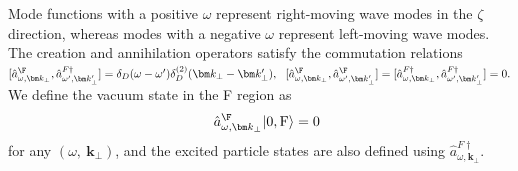 \documentclass[aps,prd,preprintnumbers,nofootinbib,showpacs]{revtex4}%
\begin{document}
\begin{widetext}
Mode functions with a positive $\omega$  
represent right-moving wave modes in the $\zeta$ direction,
whereas modes with a negative
$\omega$ represent left-moving wave modes. 
The creation and annihilation operators satisfy the commutation relations
$[{\hat a}^\F_{\omega,\bm k_\perp}, {\hat a}_{\omega',\bm k_\perp'}^{F\dagger}]
=\delta_D(\omega-\omega') \delta_D^{(2)}(\bm k_\perp-\bm k_\perp'), 
~~
[{\hat a}^\F_{\omega,\bm k_\perp}, {\hat a}_{\omega',\bm k_\perp'}^\F]
=[{\hat a}^{F\dagger}_{\omega,\bm k_\perp}, {\hat a}_{\omega',\bm k_\perp'}^{F\dagger}]
=0.
$
We define the vacuum state in the F region as 
\begin{eqnarray}
&&
\hat a_{\omega,\bm k_\perp}^\F|0,{\rm F}\rangle=0 
\label{fourdFvauum}
\end{eqnarray}
for any $(\omega,~\bm k_\perp)$, and the excited particle states are also defined using 
$\hat a_{\omega,\bm k_\perp}^{F\dagger}$. 


\end{widetext}
\end{document}
